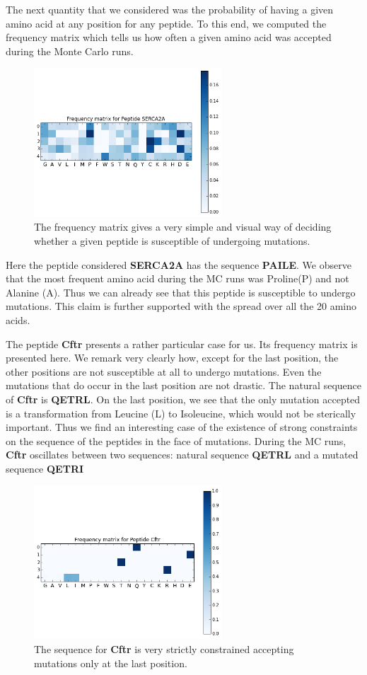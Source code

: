 \documentclass[a4paper, 12pt]{article}
\begin{document}
 	The next quantity that we considered was the probability of having a given amino acid at any position for any peptide. To this end, we computed the frequency matrix which tells us how often a given amino acid was accepted during the Monte Carlo runs. 

 	\begin{figure}[!h]
 	\label{freq_matrix}
 	\centering
 	\includegraphics[width=7cm]{Images/freq_matrix.png}
 	\caption{The frequency matrix gives a very simple and visual way of deciding whether a given peptide is susceptible of undergoing mutations.} 
 	\end{figure}

 	Here the peptide considered \textbf{SERCA2A} has the sequence \textbf{PAILE}. We observe that the most frequent amino acid during the MC runs was Proline(P) and not Alanine (A). Thus we can already see that this peptide is susceptible to undergo mutations. This claim is further supported with the spread over all the 20 amino acids. 

 	The peptide \textbf{Cftr} presents a rather particular case for us. Its frequency matrix is presented here. We remark very clearly how, except for the last position, the other positions are not susceptible at all to undergo mutations. Even the mutations that do occur in the last position are not drastic. The natural sequence of \textbf{Cftr} is \textbf{QETRL}. On the last position, we see that the only mutation accepted is a transformation from Leucine (L) to Isoleucine, which would not be sterically important. Thus we find an interesting case of the existence of strong constraints on the sequence of the peptides in the face of mutations. During the MC runs, \textbf{Cftr} oscillates between two sequences: natural sequence \textbf{QETRL} and a mutated sequence \textbf{QETRI} 

 	\begin{figure}
 	\label{cft_freq}
 	\centering
 	\includegraphics[width = 7cm]{Images/cftr.png}
 	\caption{The sequence for \textbf{Cftr} is very strictly constrained accepting mutations only at the last position.}
 	\end{figure} 
\end{document}
